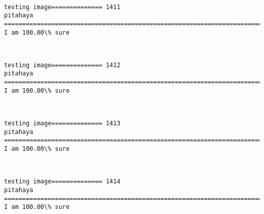 \documentclass[11pt]{article}
\begin{document}
    \begin{center}
    \end{center}
    { \hspace*{\fill} \\}
    
    \begin{Verbatim}[commandchars=\\\{\}]
testing image============== 1411
pitahaya
============================================================================
I am 100.00\% sure

    \end{Verbatim}

    \begin{center}
    \end{center}
    { \hspace*{\fill} \\}
    
    \begin{Verbatim}[commandchars=\\\{\}]
testing image============== 1412
pitahaya
============================================================================
I am 100.00\% sure

    \end{Verbatim}

    \begin{center}
    \end{center}
    { \hspace*{\fill} \\}
    
    \begin{Verbatim}[commandchars=\\\{\}]
testing image============== 1413
pitahaya
============================================================================
I am 100.00\% sure

    \end{Verbatim}

    \begin{center}
    \end{center}
    { \hspace*{\fill} \\}
    
    \begin{Verbatim}[commandchars=\\\{\}]
testing image============== 1414
pitahaya
============================================================================
I am 100.00\% sure

    \end{Verbatim}
\end{document}
